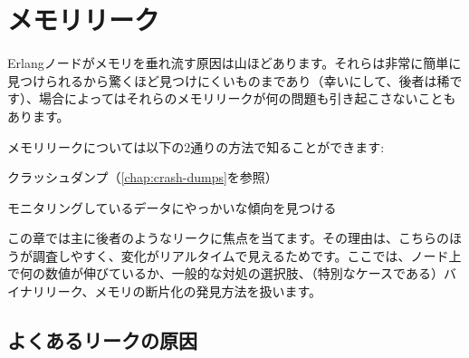 \chapter{メモリリーク}
\label{chap:memory-leaks}

Erlangノードがメモリを垂れ流す原因は山ほどあります。それらは非常に簡単に見つけられるから驚くほど見つけにくいものまであり（幸いにして、後者は稀です）、場合によってはそれらのメモリリークが何の問題も引き起こさないこともあります。

メモリリークについては以下の2通りの方法で知ることができます:

\begin{enumerate*}
	\item クラッシュダンプ（\ref{chap:crash-dumps}を参照）
	\item モニタリングしているデータにやっかいな傾向を見つける
\end{enumerate*}

この章では主に後者のようなリークに焦点を当てます。その理由は、こちらのほうが調査しやすく、変化がリアルタイムで見えるためです。ここでは、ノード上で何の数値が伸びているか、一般的な対処の選択肢、（特別なケースである）バイナリリーク、メモリの断片化の発見方法を扱います。

\section{よくあるリークの原因}

